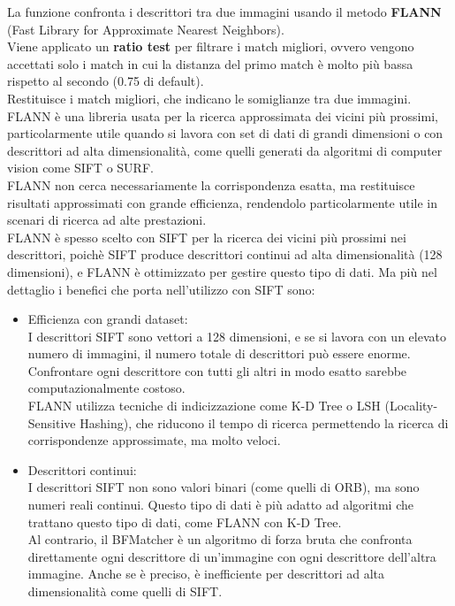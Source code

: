 \documentclass[12pt,a4paper,openright,twoside]{book}
\begin{document}
\begin{enumerate}
\begin{enumerate}
La funzione confronta i descrittori tra due immagini usando il metodo \textbf{FLANN} (Fast Library for Approximate Nearest Neighbors).\\
Viene applicato un \textbf{ratio test} per filtrare i match migliori, ovvero vengono accettati solo i match in cui la distanza del primo match è molto più bassa rispetto al secondo (0.75 di default).\\
Restituisce i match migliori, che indicano le somiglianze tra due immagini.\\
FLANN è una libreria usata per la ricerca approssimata dei vicini più prossimi, particolarmente utile quando si lavora con set di dati di grandi dimensioni o con descrittori ad alta dimensionalità, come quelli generati da algoritmi di computer vision come SIFT o SURF.\\
FLANN non cerca necessariamente la corrispondenza esatta, ma restituisce risultati approssimati con grande efficienza, rendendolo particolarmente utile in scenari di ricerca ad alte prestazioni.\\
FLANN  è spesso scelto con SIFT per la ricerca dei vicini più prossimi nei descrittori, poichè SIFT produce descrittori continui ad alta dimensionalità (128 dimensioni), e FLANN è ottimizzato per gestire questo tipo di dati. Ma più nel dettaglio i benefici che porta nell'utilizzo con SIFT sono:
\begin{itemize}
\item Efficienza con grandi dataset:\\
I descrittori SIFT sono vettori a 128 dimensioni, e se si lavora con un elevato numero di immagini, il numero totale di descrittori può essere enorme. Confrontare ogni descrittore con tutti gli altri in modo esatto sarebbe computazionalmente costoso.\\
FLANN utilizza tecniche di indicizzazione come K-D Tree o LSH (Locality-Sensitive Hashing), che riducono il tempo di ricerca permettendo la ricerca di corrispondenze approssimate, ma molto veloci.
\item Descrittori continui:\\
I descrittori SIFT non sono valori binari (come quelli di ORB), ma sono numeri reali continui. Questo tipo di dati è più adatto ad algoritmi che trattano questo tipo di dati, come FLANN con K-D Tree.\\
Al contrario, il BFMatcher è un algoritmo di forza bruta che confronta direttamente ogni descrittore di un'immagine con ogni descrittore dell'altra immagine. Anche se è preciso, è inefficiente per descrittori ad alta dimensionalità come quelli di SIFT.

\end{itemize}
\end{enumerate}
\end{enumerate}
\end{document}
